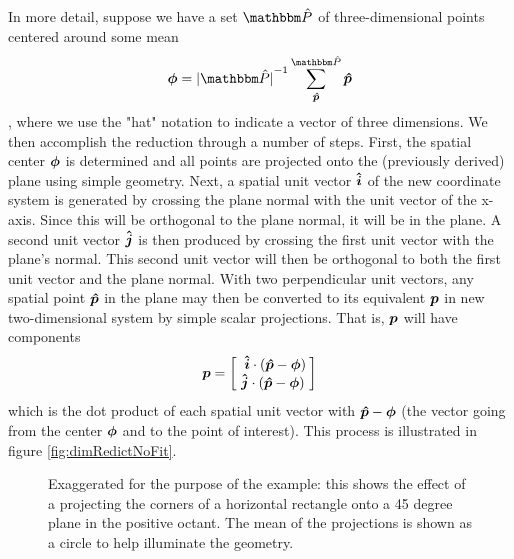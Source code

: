 In more detail, suppose we have a  set  $ \s{\hat{P}}$ of three-dimensional points centered around some mean
$$ \b{\phi} =\setSize{\s{\hat{P}}}^{-1}  \sum_{\b{\hat{p}}}^{\s{\hat{P}}} \b{\hat{p}} $$
, where we use the "hat" notation to indicate a vector of three dimensions. We then accomplish the reduction through a number of steps. First, the spatial center $\boldsymbol{\phi}$ is determined and all points are projected onto the (previously derived) plane using simple geometry. Next, a spatial unit vector $\boldsymbol{\hat{i}}$ of the new coordinate system is generated by crossing the plane normal with the unit vector of the x-axis. Since this will be orthogonal to the plane normal, it will be in the plane. A second unit vector $\boldsymbol{\hat{j}}$ is then produced by crossing the first unit vector with the plane's normal. This second unit vector will then be orthogonal to both the first unit vector and the plane normal. With two perpendicular unit vectors, any spatial point $\boldsymbol{\hat{p}}$ in the plane may then be converted to its equivalent $\boldsymbol{{p}}$ in new two-dimensional system by simple scalar projections. That is, $\boldsymbol{{p}}$ will have components 
 $$ \boldsymbol{p} = \begin{bmatrix}  \  \boldsymbol{\hat{i}} \cdot  (\boldsymbol{\hat{p}}-\boldsymbol{\phi}) \\ \ \boldsymbol{\hat{j}} \cdot  (\boldsymbol{\hat{p}}-\boldsymbol{\phi}) \   \end{bmatrix} $$
which is the dot product of each spatial unit vector with  $\boldsymbol{\hat{p}}-\boldsymbol{\phi}$ (the vector going from the center $\boldsymbol{\phi}$ and to the point of interest). This process is illustrated in figure 	\ref{fig:dimRedictNoFit}.
 


\begin{figure}[!h]
	\begin{center}
		\caption{Exaggerated for the purpose of the example: this shows the effect of a projecting the corners of a horizontal rectangle onto a 45 degree plane in the positive octant. The mean of the projections is shown as a circle to help illuminate the geometry.} %
		\label{fig:planeProjectNoFit1}
	\end{center}
\end{figure}

